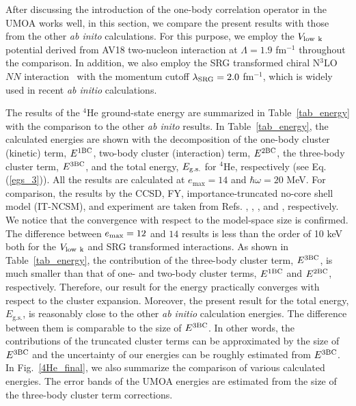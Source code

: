 \documentclass[aps,prc, dvips, twocolumn,groupedaddress,showkeys,showpacs,floatfix,superscriptaddress]{revtex4-1}
\newcommand{\<}{\langle}
\renewcommand{\>}{\rangle}
\begin{document}
After discussing the introduction of the one-body correlation operator in the UMOA works well,
in this section, we compare the present results with those from the other {\it ab inito} calculations.
For this purpose, we employ the $V_{\rm low \ k}$ potential derived from AV18 two-nucleon
 interaction at $\Lambda = 1.9$ fm$^{-1}$ throughout the comparison.
In addition, we also employ the SRG transformed chiral N$^{3}$LO $NN$ interaction~\cite{Entem:2003} with
 the momentum cutoff $\lambda_{\rm SRG} = 2.0$ fm$^{-1}$, which is widely used in recent
 {\it ab initio} calculations.

The results of the $^4$He ground-state energy are summarized in Table~\ref{tab_energy}
with the comparison to the other {\it ab inito} results.
In Table~\ref{tab_energy}, the calculated energies are shown with the decomposition of the one-body cluster (kinetic) term, $E^{{\rm 1BC}}$,
two-body cluster (interaction) term, $E^{{\rm 2BC}}$, the three-body cluster term, $E^{{\rm 3BC}}$, and the total energy,
$E_{\rm g.s.}$ for $^{4}$He, respectively (see Eq. (\ref{egs_3})).
All the results are calculated at $e_{\text{max}}=14$ and $\hbar\omega=20$ MeV.
For comparison, the results by the CCSD, FY, importance-truncated no-core shell model (IT-NCSM), and experiment
are taken from Refs. \cite{Hagen:2007}, \cite{Nogga:2004, Hagen:2007}, \cite{Roth:2011}, and  \cite{Wang:2012}, respectively.
We notice that the convergence with respect to the model-space size is confirmed.
The difference between $e_{{\rm max}} = 12$ and $14$ results is less than the order
 of 10 keV both for the $V_{\rm low \ k}$ and SRG transformed interactions.
As shown in Table~\ref{tab_energy}, the contribution of the three-body cluster term, $E^{\rm 3BC}$,
is much smaller than that of one- and two-body cluster terms, $E^{\rm 1BC}$ and $E^{\rm 2BC}$, respectively.
Therefore, our result for the energy practically converges with respect to the cluster expansion.
Moreover, the present result for the total energy, $E_{\text{g.s.}}$, is reasonably close to the other {\it ab initio} calculation energies.
The difference between them is comparable to the size of $E^{\rm 3BC}$.
In other words, the contributions of the truncated cluster terms can be approximated by the size of $E^{\rm 3BC}$ and
  the uncertainty of our energies can be roughly estimated from $E^{\rm 3BC}$.
In Fig.~\ref{4He_final}, we also summarize the comparison of various calculated energies.
The error bands of the UMOA energies are estimated from the size of the three-body cluster term corrections.
\end{document}

